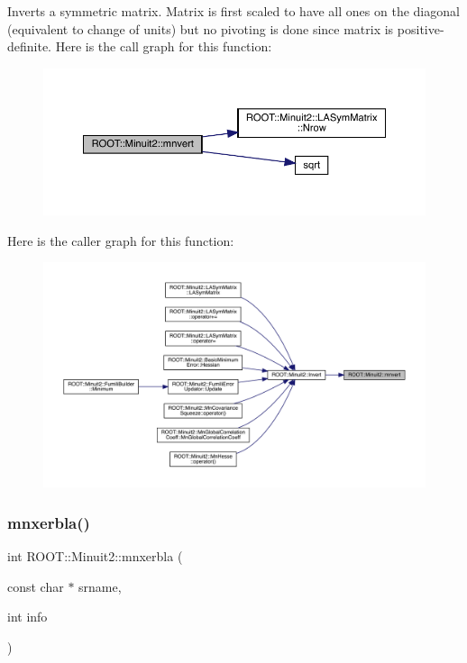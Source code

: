 Inverts a symmetric matrix. Matrix is first scaled to have all ones on the diagonal (equivalent to change of units) but no pivoting is done since matrix is positive-\/definite. Here is the call graph for this function\+:\nopagebreak
\begin{figure}[H]
\begin{center}
\leavevmode
\includegraphics[width=350pt]{d6/d3a/namespaceROOT_1_1Minuit2_a5e64c8eae56aaee62f3b683068e1148a_cgraph}
\end{center}
\end{figure}
Here is the caller graph for this function\+:\nopagebreak
\begin{figure}[H]
\begin{center}
\leavevmode
\includegraphics[width=350pt]{d6/d3a/namespaceROOT_1_1Minuit2_a5e64c8eae56aaee62f3b683068e1148a_icgraph}
\end{center}
\end{figure}
\mbox{\label{namespaceROOT_1_1Minuit2_a6c2d97c42f0b3f75b7370ae5e6f2c638}} 
\subsubsection{\texorpdfstring{mnxerbla()}{mnxerbla()}}
{\footnotesize\ttfamily int R\+O\+O\+T\+::\+Minuit2\+::mnxerbla (\begin{DoxyParamCaption}\item[{const char $\ast$}]{srname,  }\item[{int}]{info }\end{DoxyParamCaption})}

